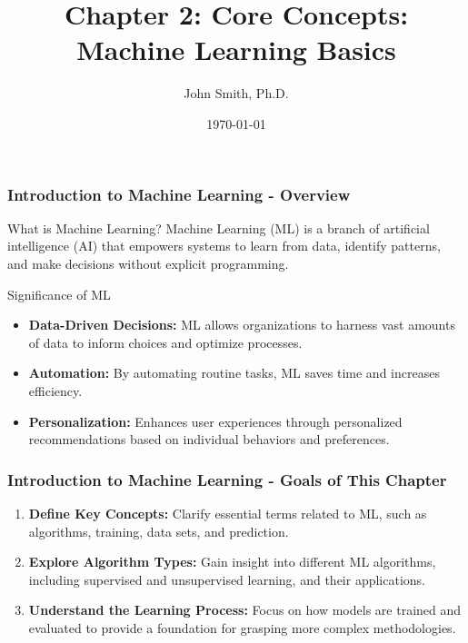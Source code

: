 \documentclass[aspectratio=169]{beamer}
\title[Machine Learning Basics]{Chapter 2: Core Concepts: Machine Learning Basics}
\author[J. Smith]{John Smith, Ph.D.}
\institute[University Name]{
  Department of Computer Science\\
  University Name\\
  \vspace{0.3cm}
  Email: email@university.edu\\
  Website: www.university.edu
}
\date{\today}
\begin{document}
\frame{\titlepage}

\begin{frame}[fragile]
    \frametitle{Introduction to Machine Learning - Overview}
    \begin{block}{What is Machine Learning?}
        Machine Learning (ML) is a branch of artificial intelligence (AI) that empowers systems to learn from data, identify patterns, and make decisions without explicit programming.
    \end{block}
    \begin{block}{Significance of ML}
        \begin{itemize}
            \item \textbf{Data-Driven Decisions:} ML allows organizations to harness vast amounts of data to inform choices and optimize processes.
            \item \textbf{Automation:} By automating routine tasks, ML saves time and increases efficiency.
            \item \textbf{Personalization:} Enhances user experiences through personalized recommendations based on individual behaviors and preferences.
        \end{itemize}
    \end{block}
\end{frame}

\begin{frame}[fragile]
    \frametitle{Introduction to Machine Learning - Goals of This Chapter}
    \begin{enumerate}
        \item \textbf{Define Key Concepts:} Clarify essential terms related to ML, such as algorithms, training, data sets, and prediction.
        \item \textbf{Explore Algorithm Types:} Gain insight into different ML algorithms, including supervised and unsupervised learning, and their applications.
        \item \textbf{Understand the Learning Process:} Focus on how models are trained and evaluated to provide a foundation for grasping more complex methodologies.
    \end{enumerate}
\end{frame}
\end{document}
